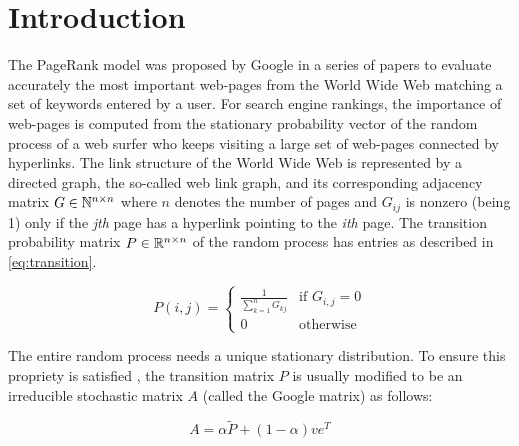 \section{Introduction}

The PageRank model was proposed by Google in a series of papers to evaluate accurately the most important web-pages from the World Wide Web matching a set of keywords entered by a user. For search engine rankings, the importance of web-pages is computed from the stationary probability vector of the random process of a web surfer who keeps visiting a large set of web-pages connected by hyperlinks. The link structure of the World Wide Web is represented by a directed graph, the so-called web link graph, and its corresponding adjacency matrix $G \in \mathbb{N}^{n \times n}$ where $n$ denotes the number of pages and $G_{ij}$ is nonzero (being 1) only if the \emph{jth} page has a hyperlink pointing to the \emph{ith} page. The transition probability matrix $P \in \mathbb{R}^{n \times n}$ of the random process has entries as described in \ref{eq:transition}.

\begin{equation}\label{eq:transition}
    P(i,j) =
    \begin{cases}
        \displaystyle \frac{1}{\sum_{k=1}^n G_{kj}} & \text{if } G_{i,j} = 0 \\
        0 & \text{otherwise}
    \end{cases}
\end{equation}

\noindent The entire random process needs a unique stationary distribution. To ensure this propriety is satisfied , the transition matrix $P$ is usually modified to be an irreducible stochastic matrix $A$ (called the Google matrix) as follows:


\begin{equation}\label{eq:google}
    A = \alpha \tilde P + (1 - \alpha)v e^T
\end{equation}

